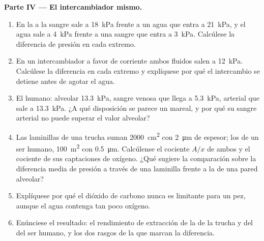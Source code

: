 \begin{problem}
\medskip
\noindent\textbf{Parte IV --- El intercambiador mismo.}
\begin{enumerate}[resume]
  \item En la  a  la sangre sale a \qty{18}{kPa}
        frente a un agua que entra a \qty{21}{kPa}, y el agua sale a
        \qty{4}{kPa} frente a una sangre que entra a \qty{3}{kPa}.
        Calcúlese la diferencia de presión en cada extremo.
  \item En un intercambiador a favor de corriente ambos fluidos salen a
        \qty{12}{kPa}. Calcúlese la diferencia en cada extremo y
        explíquese por qué el intercambio se detiene antes de agotar el
        agua.
  \item El  humano: alveolar \qty{13.3}{kPa}, sangre venosa que llega
        a \qty{5.3}{kPa}, arterial que sale a \qty{13.3}{kPa}. ¿A qué
        disposición se parece un  mareal, y por qué su sangre
        arterial no puede superar el valor alveolar?
  \item Las laminillas de una trucha suman \qty{2000}{cm^2} con
        \qty{2}{\micro m} de espesor; los  de un ser humano,
        \qty{100}{m^2} con \qty{0.5}{\micro m}. Calcúlense el cociente
        $A/x$ de ambos y el cociente de sus captaciones de oxígeno. ¿Qué
        sugiere la comparación sobre la diferencia media de presión a
        través de una laminilla frente a la de una pared alveolar?
  \item Explíquese por qué el dióxido de carbono nunca es limitante para un
        pez, aunque el agua contenga tan poco oxígeno.
  \item Enúnciese el resultado: el rendimiento de extracción de la 
        de la trucha y del  del ser humano, y los dos rasgos de la
         que marcan la diferencia.
\end{enumerate}
\end{problem}

